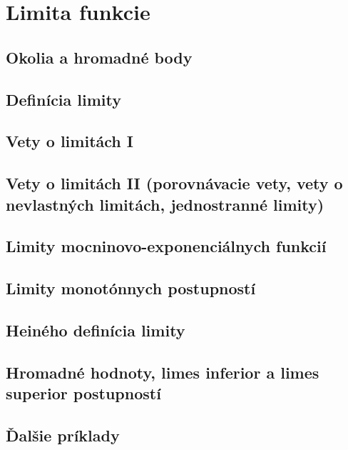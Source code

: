\chapter{Limita funkcie}%


\section{Okolia a hromadné body}


\section{Definícia limity}


\section{Vety o limitách I}


\section[Vety o limitách II]{Vety o limitách II (porovnávacie vety, vety o nevlastných limitách, jednostranné limity)}


\section{Limity mocninovo-exponenciálnych funkcií}


\section{Limity monotónnych postupností}


\section{Heiného definícia limity}


\section[Hromadné hodnoty]{Hromadné hodnoty, limes inferior a limes superior postupností}


\section{Ďalšie príklady}

